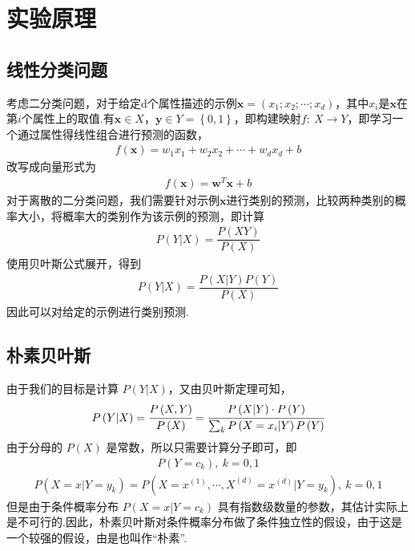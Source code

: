 \documentclass{hitreport}
\begin{document}
\section{实验原理}

\subsection{线性分类问题}

考虑二分类问题，对于给定d个属性描述的示例$\boldsymbol{x} = \left(x_1;x_2;\cdots;x_d\right)$，其中$x_i$是$\boldsymbol{x}$在第$i$个属性上的取值.有$\boldsymbol{x} \in X$，$\boldsymbol{y}\in Y=\left\{0,1\right\}$，即构建映射$f: \ X\rightarrow Y$，即学习一个通过属性得线性组合进行预测的函数，
\begin{align}
f\left(\boldsymbol{x}\right) = w_1x_1+w_2x_2+\cdots+w_dx_d + b
\end{align}
改写成向量形式为
\begin{align}
f\left(\boldsymbol{x}\right) = \boldsymbol{w}^T\boldsymbol{x}+b
\end{align}
对于离散的二分类问题，我们需要针对示例$\boldsymbol{x}$进行类别的预测，比较两种类别的概率大小，将概率大的类别作为该示例的预测，即计算
\begin{align}
P(Y|X) = \dfrac{P\left(XY\right)}{P\left(X\right)}
\end{align}
使用贝叶斯公式展开，得到
\begin{align}
P(Y|X) = \dfrac{P\left(X|Y\right)P\left(Y\right)}{P\left(X\right)}
\end{align}
因此可以对给定的示例进行类别预测.


\subsection{朴素贝叶斯}

由于我们的目标是计算 $P\left(Y|X\right)$，又由贝叶斯定理可知，
\begin{align}
P\left(Y|X\right)=\cfrac{P\left(X,Y\right)}{P\left(X\right)}=\cfrac{P\left(X|Y\right)\cdot P\left(Y\right)}{\sum_{k}{P\left(X=x_i|Y\right)P\left(Y\right)}}
\end{align}
由于分母的 $P\left(X\right)$ 是常数，所以只需要计算分子即可，即
\begin{align}
P\left(Y=c_k\right),\  k=0,1
\end{align}
\begin{align}
P\left(X=x|Y=y_k\right)=P\left(X=x^{\left(1\right)},\cdots,X^{\left(d\right)}=x^{\left(d\right)}|Y=y_k\right), \ k=0,1
\end{align}
但是由于条件概率分布 $P\left(X=x|Y=c_k\right)$ 具有指数级数量的参数，其估计实际上是不可行的.因此，朴素贝叶斯对条件概率分布做了条件独立性的假设，由于这是一个较强的假设，由是也叫作“朴素”.
\end{document}

